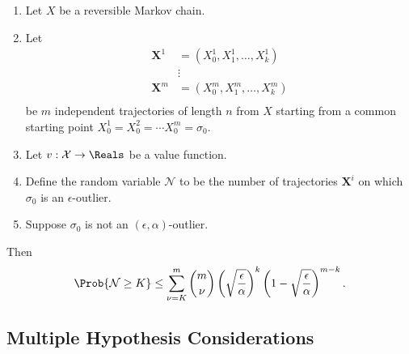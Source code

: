 \documentclass[12pt]{article}
\begin{document}
\begin{corollary}
    \begin{enumerate}
        \item
            Let \( X \) be a reversible Markov chain.
        \item
            Let
            \begin{align*}
                \mathbf{X}^1 &= (X_0^1, X_1^1, \dots, X_k^1 )\\
                &\vdots \\
                \mathbf{X}^m &= (X_0^m, X_1^m, \dots, X_k^m )\\
            \end{align*}
            be \( m \) independent trajectories of length \( n \) from \(
            X \) starting from a common starting point \( X_0^1 = X_0^2
            = \cdots X_0^m = \sigma_0 \).
        \item
            Let \( v :  \mathcal{X} \to \Reals \) be a value function.
        \item
            Define the random variable \( \mathcal{N} \) to be the
            number of trajectories \( \mathbf{X}^i \) on which \( \sigma_0
            \) is an \( \epsilon \)-outlier.
        \item
            Suppose \( \sigma_0 \) is not an \( (\epsilon, \alpha) \)-outlier.
    \end{enumerate}
    Then
    \[
        \Prob{\mathcal{N} \ge K} \le \sum\limits_ {\nu=K}^m \binom{m}{\nu}
        \left( \sqrt{\frac{\epsilon} {\alpha}} \right)^k \left( 1 - \sqrt{\frac
        {\epsilon}{\alpha}} \right)^ {m-k}.
    \]
\end{corollary}

\subsection*{Multiple Hypothesis Considerations}
\end{document}

